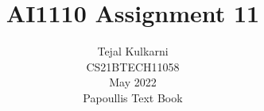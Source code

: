 \documentclass[journal,12pt,two column]{IEEEtran}
\title{AI1110 Assignment 11 }
\author{Tejal Kulkarni \\ CS21BTECH11058 \\\vspace*{20pt} May 2022 \\  Papoullis Text Book }
\newcommand*{\permcomb}[4][0mu]{{{}^{#3}\mkern#1#2_{#4}}}
\begin{document}
\maketitle

\newcommand{\solution}{\noindent \textbf{Solution: }}
\providecommand{\pr}[1]{\ensuremath{\Pr\left(#1\right)}}
\providecommand{\cdf}[2]{\ensuremath{\text{F}_{#1}\left(#2\right)}}
\providecommand{\qfunc}[1]{\ensuremath{Q\left(#1\right)}}
\providecommand{\sbrak}[1]{\ensuremath{{}\left[#1\right]}}
\providecommand{\lsbrak}[1]{\ensuremath{{}\left[#1\right.}}
\providecommand{\rsbrak}[1]{\ensuremath{{}\left.#1\right]}}
\providecommand{\brak}[1]{\ensuremath{\left(#1\right)}}
\providecommand{\lbrak}[1]{\ensuremath{\left(#1\right.}}
\providecommand{\rbrak}[1]{\ensuremath{\left.#1\right)}}
\providecommand{\cbrak}[1]{\ensuremath{\left\{#1\right\}}}
\providecommand{\lcbrak}[1]{\ensuremath{\left\{#1\right.}}
\newcommand*{\comb}[1][-1mu]{\permcomb[#1]{C}}
\renewcommand{\thetable}{\arabic{table}}
\providecommand{\rcbrak}[1]{\ensuremath{\left.#1\right\}}}
\end{document}
